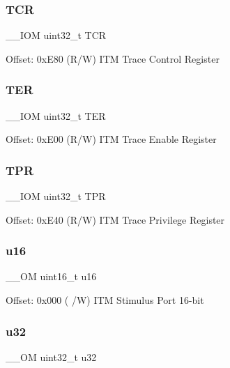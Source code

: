 \subsubsection{\texorpdfstring{TCR}{TCR}}
{\footnotesize\ttfamily \+\_\+\+\_\+\+I\+OM uint32\+\_\+t T\+CR}

Offset\+: 0x\+E80 (R/W) I\+TM Trace Control Register \mbox{\label{struct_i_t_m___type_aa6530efad3a727fb3cc8f509403b9948}} 
\subsubsection{\texorpdfstring{TER}{TER}}
{\footnotesize\ttfamily \+\_\+\+\_\+\+I\+OM uint32\+\_\+t T\+ER}

Offset\+: 0x\+E00 (R/W) I\+TM Trace Enable Register \mbox{\label{struct_i_t_m___type_afe5e266862734ca1082ceddff7180688}} 
\subsubsection{\texorpdfstring{TPR}{TPR}}
{\footnotesize\ttfamily \+\_\+\+\_\+\+I\+OM uint32\+\_\+t T\+PR}

Offset\+: 0x\+E40 (R/W) I\+TM Trace Privilege Register \mbox{\label{struct_i_t_m___type_ae93660eefe2482a8564fae9a1ca39739}} 
\subsubsection{\texorpdfstring{u16}{u16}}
{\footnotesize\ttfamily \+\_\+\+\_\+\+OM uint16\+\_\+t u16}

Offset\+: 0x000 ( /W) I\+TM Stimulus Port 16-\/bit \mbox{\label{struct_i_t_m___type_ae89dd50f788f12863c681fba1a5b60d1}} 
\subsubsection{\texorpdfstring{u32}{u32}}
{\footnotesize\ttfamily \+\_\+\+\_\+\+OM uint32\+\_\+t u32}

